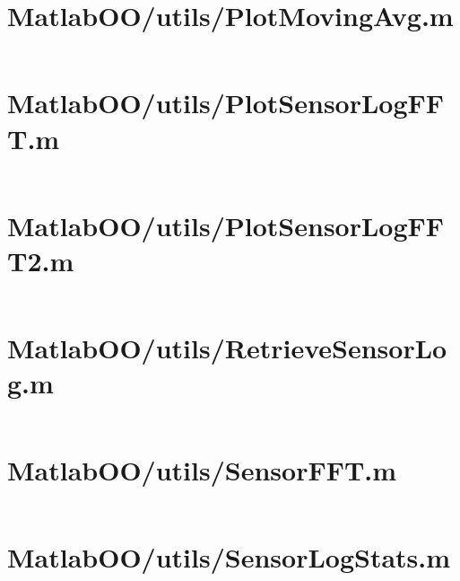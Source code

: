 \pagebreak
\section*{MatlabOO/utils/PlotMovingAvg.m}\label{code:MatlabOO/utils/PlotMovingAvg.m}
\inputminted[linenos,fontsize=\scriptsize]{matlab}{/home/dcouture/git/mathyourlife/TSatPy/beta_versions/matlab_object_oriented/utils/PlotMovingAvg.m}

\pagebreak
\section*{MatlabOO/utils/PlotSensorLogFFT.m}\label{code:MatlabOO/utils/PlotSensorLogFFT.m}
\inputminted[linenos,fontsize=\scriptsize]{matlab}{/home/dcouture/git/mathyourlife/TSatPy/beta_versions/matlab_object_oriented/utils/PlotSensorLogFFT.m}

\pagebreak
\section*{MatlabOO/utils/PlotSensorLogFFT2.m}\label{code:MatlabOO/utils/PlotSensorLogFFT2.m}
\inputminted[linenos,fontsize=\scriptsize]{matlab}{/home/dcouture/git/mathyourlife/TSatPy/beta_versions/matlab_object_oriented/utils/PlotSensorLogFFT2.m}

\pagebreak
\section*{MatlabOO/utils/RetrieveSensorLog.m}\label{code:MatlabOO/utils/RetrieveSensorLog.m}
\inputminted[linenos,fontsize=\scriptsize]{matlab}{/home/dcouture/git/mathyourlife/TSatPy/beta_versions/matlab_object_oriented/utils/RetrieveSensorLog.m}

\pagebreak
\section*{MatlabOO/utils/SensorFFT.m}\label{code:MatlabOO/utils/SensorFFT.m}
\inputminted[linenos,fontsize=\scriptsize]{matlab}{/home/dcouture/git/mathyourlife/TSatPy/beta_versions/matlab_object_oriented/utils/SensorFFT.m}

\pagebreak
\section*{MatlabOO/utils/SensorLogStats.m}\label{code:MatlabOO/utils/SensorLogStats.m}
\inputminted[linenos,fontsize=\scriptsize]{matlab}{/home/dcouture/git/mathyourlife/TSatPy/beta_versions/matlab_object_oriented/utils/SensorLogStats.m}

